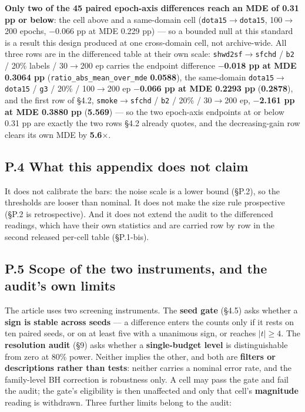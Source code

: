 \documentclass[pdflatex,sn-mathphys-ay]{sn-jnl}
\begin{document}
\textbf{Only two of the 45 paired epoch-axis differences reach an MDE of 0.31 pp or below}: the cell above and a same-domain cell (\texttt{dota15\ensuremath{\rightarrow}dota15}, 100\ensuremath{\rightarrow}200 epochs, $-$0.066 pp at MDE 0.229 pp) --- so a bounded null at this standard is a result this design produced at one cross-domain cell, not archive-wide. All three rows are in the differenced table at their own scale: \texttt{shwd2sf\ensuremath{\rightarrow}sfchd} / \texttt{b2} / 20\% labels / 30\ensuremath{\rightarrow}200 ep carries the endpoint difference \textbf{\ensuremath{-}0.018 pp at MDE 0.3064 pp} (\texttt{ratio\_abs\_mean\_over\_mde} \textbf{0.0588}), the same-domain \texttt{dota15\ensuremath{\rightarrow}dota15} / \texttt{g3} / 20\% / 100\ensuremath{\rightarrow}200 ep \textbf{\ensuremath{-}0.066 pp at MDE 0.2293 pp} (\textbf{0.2878}), and the first row of \S{}4.2, \texttt{smoke\ensuremath{\rightarrow}sfchd} / \texttt{b2} / 20\% / 30\ensuremath{\rightarrow}200 ep, \textbf{\ensuremath{-}2.161 pp at MDE 0.3880 pp} (\textbf{5.569}) --- so the two epoch-axis endpoints at or below 0.31 pp are exactly the two rows \S{}4.2 already quotes, and the decreasing-gain row clears its own MDE by \textbf{5.6\ensuremath{\times}}.

\subsection*{P.4 What this appendix does not claim}

It does not calibrate the bars: the noise scale is a lower bound (\S{}P.2), so the thresholds are looser than nominal. It does not make the size rule prospective (\S{}P.2 is retrospective). And it does not extend the audit to the differenced readings, which have their own statistics and are carried row by row in the second released per-cell table (\S{}P.1-bis).

\subsection*{P.5 Scope of the two instruments, and the audit's own limits}

The article uses two screening instruments. The \textbf{seed gate} (\S{}4.5) asks whether a \textbf{sign is stable across seeds} --- a difference enters the counts only if it rests on ten paired seeds, or on at least five with a unanimous sign, or reaches $|t|\ge4$. The \textbf{resolution audit} (\S{}9) asks whether a \textbf{single-budget level} is distinguishable from zero at 80\% power. Neither implies the other, and both are \textbf{filters or descriptions rather than tests}: neither carries a nominal error rate, and the family-level BH correction is robustness only. A cell may pass the gate and fail the audit; the gate's eligibility is then unaffected and only that cell's \textbf{magnitude} reading is withdrawn. Three further limits belong to the audit:
\end{document}
